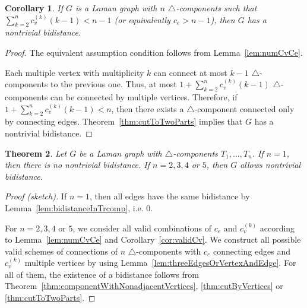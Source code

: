 \documentclass[a4paper, 11pt]{article}
\newcommand{\trcomp}{$\triangle$-component}
\newcommand{\trcomps}{$\triangle$-components}
\newcommand{\cv}[1]{c_v^{(#1)}}
\newtheorem{thm}{Theorem}[section]
\newtheorem{cor}[thm]{Corollary}
\theoremstyle{definition}
\begin{document}
\begin{cor}
\label{cor:manyConnectingEdges}
If $G$ is a Laman graph with $n$ \trcomps{} such that $\sum_{k=2}^n \cv{k}(k-1) < n-1$ (or equivalently $c_e>n-1$), then $G$ has a nontrivial bidistance.
\end{cor}
\begin{proof}
The equivalent assumption condition follows from Lemma~\ref{lem:numCvCe}.

Each multiple vertex with multiplicity $k$ can connect at most $k-1$ \trcomps{} to the previous one. Thus, at most $1+\sum_{k=2}^n \cv{k}(k-1)$ \trcomps{} can be connected by multiple vertices. Therefore, if $1+\sum_{k=2}^n \cv{k}(k-1) <n$, then there exists a \trcomp{} connected only by connecting edges. Theorem~\ref{thm:cutToTwoParts} implies that $G$ has a nontrivial bidistance.
\end{proof}

\begin{thm}
Let $G$ be a Laman graph with \trcomps{} $T_1,\dots, T_n$. If $n=1$, then there is no nontrivial bidistance. If $n=2,3,4$ or $5$, then $G$ allows nontrivial bidistance.
\end{thm}
\begin{proof}[Proof (sketch)]
If $n=1$, then all edges have the same bidistance by Lemma~\ref{lem:bidistanceInTrcomp}, i.e. 0.

For $n=2,3,4$ or $5$, we consider all valid combinations of $c_e$ and $\cv{k}$ according to Lemma~\ref{lem:numCvCe} and Corollary~\ref{cor:validCv}. We construct all possible valid schemes of connections of $n$ \trcomps{} with $c_e$ connecting edges and $\cv{k}$ multiple vertices by using Lemma~\ref{lem:threeEdgesOrVertexAndEdge}. For all of them, the existence of a bidistance follows from Theorem~\ref{thm:componentWithNonadjacentVertices}, \ref{thm:cutByVertices} or \ref{thm:cutToTwoParts}.
\end{proof}
\end{document}
